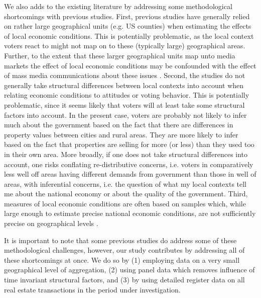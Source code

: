 \documentclass[12pt,a4paper]{article}
\begin{document}
We also adds to the existing literature by addressing some methodological shortcomings with previous studies. First, previous studies have generally relied on rather large geographical units (e.g. US counties) when estimating the effects of local economic conditions. This is potentially problematic, as the local context voters react to might not map on to these (typically large) geographical areas. Further, to the extent that these larger geographical units map unto media markets the effect of local economic conditions may be confounded with the effect of mass media communications about these issues \citep[][]{dinesen2015reconsidering}. Second, the studies do not generally take structural differences between local contexts into account when relating economic conditions to  attitudes or voting behavior. This is potentially problematic, since it seems likely that voters will at least take some structural factors into account. In the present case, voters are probably not likely to infer much about the government based on the fact that there are differences in property values between cities and rural areas. They are more likely to infer based on the fact that properties are selling for more (or less) than they used too in their own area. More broadly, if one does not take structural differences into account, one risks conflating re-distributive concerns, i.e. voters in comparatively less well off areas having different demands from government than those in well of areas, with inferential concerns, i.e. the question of what my local contexts tell me about the national economy or about the quality of the government. Third,  measures of local economic conditions are often based on samples which, while large enough to estimate precise national economic conditions, are not sufficiently precise on geographical levels \citep[][]{healy2014presidential}. 

It is important to note that some previous studies do  address some of these methodological challenges, however, our study contributes by addressing all of these shortcomings at once. We do so by (1) employing data on a very small geographical level of aggregation, (2) using panel data which removes influence of time invariant structural factors, and (3) by using detailed register data on all real estate transactions in the period under investigation.




\end{document}
